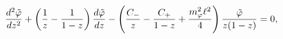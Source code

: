 \begin{equation}
{{d^2 \tilde \varphi} \over {dz^2}} +
\left (
{1 \over z} - {1 \over {1 - z}}
\right ) {{d \tilde \varphi} \over {dz}} -
\left (
{C_- \over z} - {C_+ \over {1-z}} + {{m_\varphi^2 \ell^2} \over 4}
\right ) {{\tilde \varphi} \over {z(1-z)}} = 0 ,
\label{eq-hyper1}
\end{equation}

